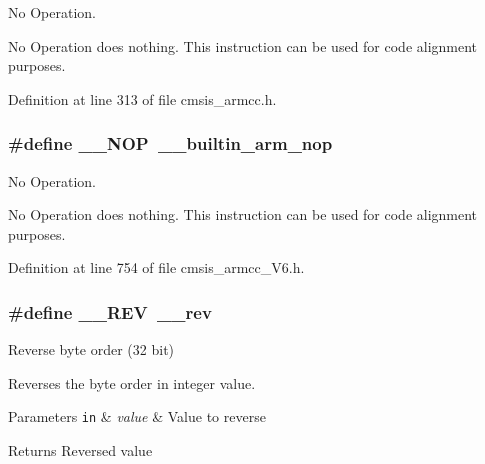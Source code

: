 No Operation. 

No Operation does nothing. This instruction can be used for code alignment purposes. 

Definition at line 313 of file cmsis\+\_\+armcc.\+h.

\subsubsection[{\texorpdfstring{\+\_\+\+\_\+\+N\+OP}{__NOP}}]{\setlength{\rightskip}{0pt plus 5cm}\#define \+\_\+\+\_\+\+N\+OP~\+\_\+\+\_\+builtin\+\_\+arm\+\_\+nop}\hypertarget{group___c_m_s_i_s___core___instruction_interface_gabd585ddc865fb9b7f2493af1eee1a572}{}\label{group___c_m_s_i_s___core___instruction_interface_gabd585ddc865fb9b7f2493af1eee1a572}


No Operation. 

No Operation does nothing. This instruction can be used for code alignment purposes. 

Definition at line 754 of file cmsis\+\_\+armcc\+\_\+\+V6.\+h.

\subsubsection[{\texorpdfstring{\+\_\+\+\_\+\+R\+EV}{__REV}}]{\setlength{\rightskip}{0pt plus 5cm}\#define \+\_\+\+\_\+\+R\+EV~\+\_\+\+\_\+rev}\hypertarget{group___c_m_s_i_s___core___instruction_interface_ga14f54807872c0f5e05604c4924abfdae}{}\label{group___c_m_s_i_s___core___instruction_interface_ga14f54807872c0f5e05604c4924abfdae}


Reverse byte order (32 bit) 

Reverses the byte order in integer value. 
\begin{DoxyParams}[1]{Parameters}
\mbox{\tt in}  & {\em value} & Value to reverse \\
\hline
\end{DoxyParams}
\begin{DoxyReturn}{Returns}
Reversed value 
\end{DoxyReturn}


